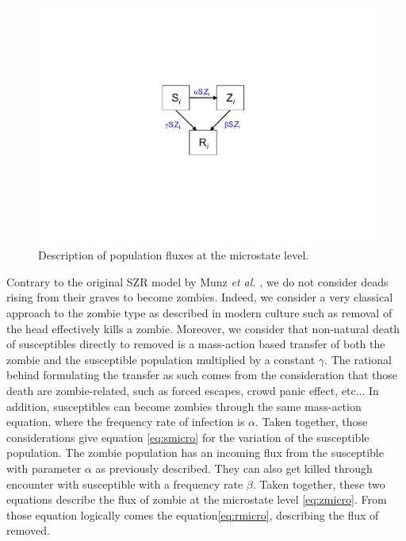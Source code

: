 \documentclass[11pt]{article} %
\begin{document}
\begin{figure}[h!]
\centerline{
\includegraphics[scale=0.55]{../images/Powerpoint_figures/microstate.pdf}}
\caption{Description of population fluxes at the microstate level. \label{microstate} }
\end{figure}

Contrary to the original SZR model by Munz \textit{et al.} \cite{munz2009zombies}, we do not consider deads rising from their graves to become zombies. Indeed, we consider a very classical approach to the zombie type as described in modern culture such as removal of the head effectively kills a zombie.  Moreover, we consider that non-natural death of susceptibles directly to removed is a mass-action based transfer of both the zombie and the susceptible population multiplied by a constant $\gamma$. The rational behind formulating the transfer as such comes from the consideration that those death are zombie-related, such as forced escapes, crowd panic effect, etc... In addition, susceptibles can become zombies through the same mass-action equation, where the frequency rate of infection is $\alpha$. Taken together, those considerations give equation \eqref{eq:smicro} for the variation of the susceptible population. The zombie population has an incoming flux from the susceptible with parameter $\alpha$ as previously described. They can also get killed through encounter with susceptible with a frequency rate $\beta$. Taken together, these two equations describe the flux of zombie at the microstate level \eqref{eq:zmicro}. From those equation logically comes the equation\eqref{eq:rmicro}, describing the flux of removed. 
\end{document}
